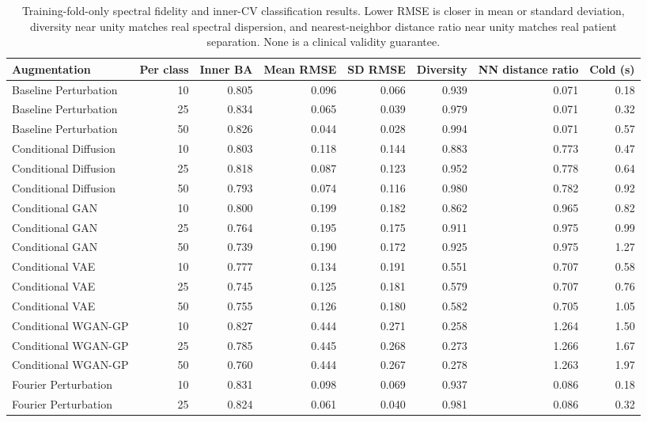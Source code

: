 \begin{table}[t]
\centering
\caption{Training-fold-only spectral fidelity and inner-CV classification results. Lower RMSE is closer in mean or standard deviation, diversity near unity matches real spectral dispersion, and nearest-neighbor distance ratio near unity matches real patient separation. None is a clinical validity guarantee.}
\label{tab:augmentation_quality}
\footnotesize
\setlength{\tabcolsep}{4pt}
\begin{tabular}{lrrrrrrr}
\toprule
Augmentation & Per class & Inner BA & Mean RMSE & SD RMSE & Diversity & NN distance ratio & Cold (s) \\
\midrule
Baseline Perturbation & 10 & 0.805 & 0.096 & 0.066 & 0.939 & 0.071 & 0.18 \\
Baseline Perturbation & 25 & 0.834 & 0.065 & 0.039 & 0.979 & 0.071 & 0.32 \\
Baseline Perturbation & 50 & 0.826 & 0.044 & 0.028 & 0.994 & 0.071 & 0.57 \\
Conditional Diffusion & 10 & 0.803 & 0.118 & 0.144 & 0.883 & 0.773 & 0.47 \\
Conditional Diffusion & 25 & 0.818 & 0.087 & 0.123 & 0.952 & 0.778 & 0.64 \\
Conditional Diffusion & 50 & 0.793 & 0.074 & 0.116 & 0.980 & 0.782 & 0.92 \\
Conditional GAN & 10 & 0.800 & 0.199 & 0.182 & 0.862 & 0.965 & 0.82 \\
Conditional GAN & 25 & 0.764 & 0.195 & 0.175 & 0.911 & 0.975 & 0.99 \\
Conditional GAN & 50 & 0.739 & 0.190 & 0.172 & 0.925 & 0.975 & 1.27 \\
Conditional VAE & 10 & 0.777 & 0.134 & 0.191 & 0.551 & 0.707 & 0.58 \\
Conditional VAE & 25 & 0.745 & 0.125 & 0.181 & 0.579 & 0.707 & 0.76 \\
Conditional VAE & 50 & 0.755 & 0.126 & 0.180 & 0.582 & 0.705 & 1.05 \\
Conditional WGAN-GP & 10 & 0.827 & 0.444 & 0.271 & 0.258 & 1.264 & 1.50 \\
Conditional WGAN-GP & 25 & 0.785 & 0.445 & 0.268 & 0.273 & 1.266 & 1.67 \\
Conditional WGAN-GP & 50 & 0.760 & 0.444 & 0.267 & 0.278 & 1.263 & 1.97 \\
Fourier Perturbation & 10 & 0.831 & 0.098 & 0.069 & 0.937 & 0.086 & 0.18 \\
Fourier Perturbation & 25 & 0.824 & 0.061 & 0.040 & 0.981 & 0.086 & 0.32 \\

\end{tabular}
\end{table}
